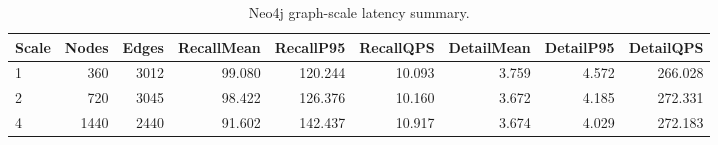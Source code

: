 \begin{table}[t]
\centering
\caption{Neo4j graph-scale latency summary.}
\label{tab:ltmg-graph-scale-latency}
\begin{tabular}{lrrrrrrrr}
\hline
Scale & Nodes & Edges & RecallMean & RecallP95 & RecallQPS & DetailMean & DetailP95 & DetailQPS \\
\hline
1 & 360 & 3012 & 99.080 & 120.244 & 10.093 & 3.759 & 4.572 & 266.028 \\
2 & 720 & 3045 & 98.422 & 126.376 & 10.160 & 3.672 & 4.185 & 272.331 \\
4 & 1440 & 2440 & 91.602 & 142.437 & 10.917 & 3.674 & 4.029 & 272.183 \\
\hline
\end{tabular}
\end{table}
